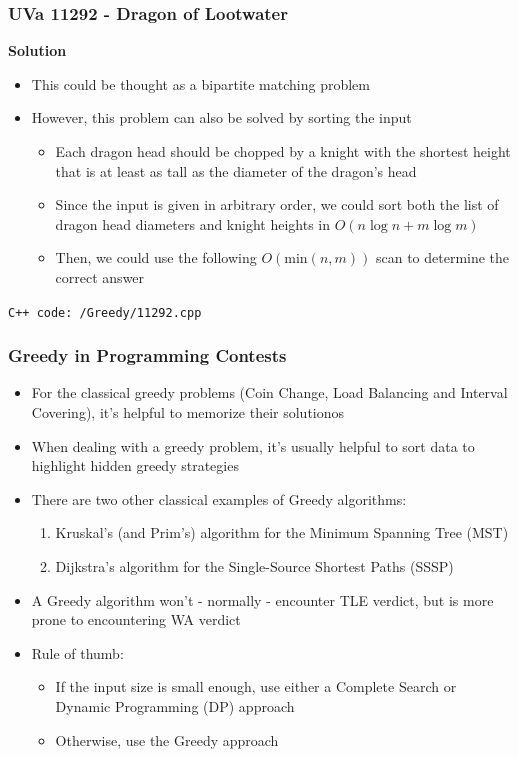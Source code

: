 \documentclass{beamer}
\begin{document}
\begin{frame}[fragile]
\frametitle{UVa 11292 - Dragon of Lootwater}

\color{red}\textbf{Solution}\color{black}\\
\begin{itemize}
    \item This could be thought as a bipartite matching problem
    \item However, this problem can also be solved by sorting the input
    	\begin{itemize}
		    \item Each dragon head should be chopped by a knight with the shortest height that is at least as tall as the diameter of the dragon's head
		    \item Since the input is given in arbitrary order, we could sort both the list of dragon head diameters and knight heights in $O(n\log n + m\log m)$
		    \item Then, we could use the following $O(\text{min}(n,m))$ scan to determine the correct answer
		\end{itemize}
\end{itemize}

\vspace{0.3cm}

\color{red}\verb|C++ code: /Greedy/11292.cpp|\color{black}
\end{frame}

\begin{frame}[fragile]
\frametitle{Greedy in Programming Contests}

\begin{itemize}
    \item For the classical greedy problems (Coin Change, Load Balancing and Interval Covering), it's helpful to memorize their solutionos
    \item When dealing with a greedy problem, it's usually helpful to sort data to highlight hidden greedy strategies
    \item There are two other classical examples of Greedy algorithms:
    	\begin{enumerate}
		    \item Kruskal's (and Prim's) algorithm for the Minimum Spanning Tree (MST)
		    \item Dijkstra's algorithm for the Single-Source Shortest Paths (SSSP)
		\end{enumerate}
	\item A Greedy algorithm won't - normally - encounter TLE verdict, but is more prone to encountering WA verdict
	\item Rule of thumb:
		\begin{itemize}
		    \item If the input size is small enough, use either a Complete Search or Dynamic Programming (DP) approach
		    \item Otherwise, use the Greedy approach
		\end{itemize}
\end{itemize}

\end{frame}
\end{document}
